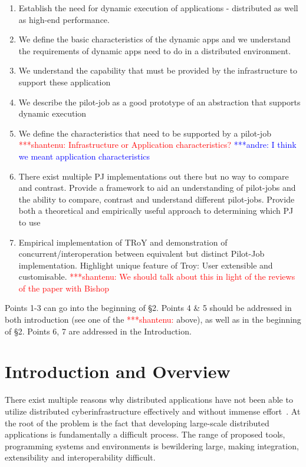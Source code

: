 \documentclass[conference,final]{IEEEtran}
\newcommand{\jhanote}[1]{ {\textcolor{red} { ***shantenu: #1 }}}
\newcommand{\alnote}[1]{ {\textcolor{blue} { ***andre: #1 }}}
\newcommand{\alnote}[1]{}
\newcommand{\jhanote}[1]{}
\begin{document}
\begin{enumerate}

\item Establish the need for dynamic execution of applications -
  distributed as well as high-end performance.

\item We define the basic characteristics of the dynamic apps and we
  understand the requirements of dynamic apps need to do in a
  distributed environment.

\item We understand the capability that must be provided by the
  infrastructure to support these application

\item We describe the pilot-job as a good prototype of an abstraction
  that supports dynamic execution

\item We define the characteristics that need to be supported by a
  pilot-job \jhanote{Infrastructure or Application characteristics?}
  \alnote{I think we meant application characteristics}

\item There exist multiple PJ implementations out there but no way to
  compare and contrast. Provide a framework to aid an understanding of
  pilot-jobs and the ability to compare, contrast and understand
  different pilot-jobs.  Provide both a theoretical and empirically
  useful approach to determining which PJ to use

\item Empirical implementation of TRoY and demonstration of
  concurrent/interoperation between equivalent but distinct Pilot-Job
  implementation. Highlight unique feature of Troy: User extensible
  and customisable. \jhanote{We should talk about this in light of the
    reviews of the paper with Bishop}
\end{enumerate}

Points 1-3 can go into the beginning of \S 2.  Points 4 \& 5 should be
addressed in both introduction (see one of the \jhanote{} above), as
well as in the beginning of \S 2. Points 6, 7 are addressed in the
Introduction.

\section{Introduction and Overview}

There exist multiple reasons why distributed applications have not
been able to utilize distributed cyberinfrastructure effectively and
without immense effort~\cite{dpa_surveypaper}.  
At the root of the problem is the fact that developing
large-scale distributed applications is fundamentally a difficult
process. The range of proposed tools, programming systems and
environments is bewildering large, making integration, extensibility
and interoperability difficult.  
\end{document}
